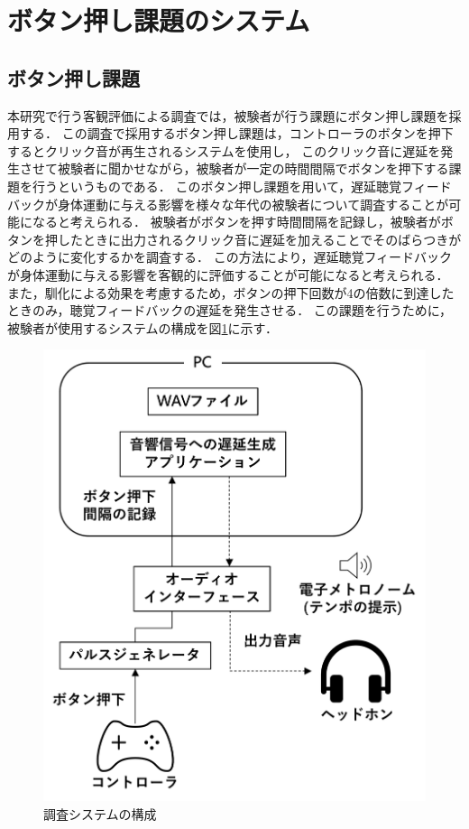 \section{ボタン押し課題のシステム}
\subsection{ボタン押し課題}
本研究で行う客観評価による調査では，被験者が行う課題にボタン押し課題を採用する．
この調査で採用するボタン押し課題は，コントローラのボタンを押下するとクリック音が再生されるシステムを使用し，
このクリック音に遅延を発生させて被験者に聞かせながら，被験者が一定の時間間隔でボタンを押下する課題を行うというものである．
このボタン押し課題を用いて，遅延聴覚フィードバックが身体運動に与える影響を様々な年代の被験者について調査することが可能になると考えられる．
被験者がボタンを押す時間間隔を記録し，被験者がボタンを押したときに出力されるクリック音に遅延を加えることでそのばらつきがどのように変化するかを調査する．
この方法により，遅延聴覚フィードバックが身体運動に与える影響を客観的に評価することが可能になると考えられる．
また，馴化による効果を考慮するため，ボタンの押下回数が4の倍数に到達したときのみ，聴覚フィードバックの遅延を発生させる．
この課題を行うために，被験者が使用するシステムの構成を図\ref{fig:button-click-system}に示す．
\begin{figure}[tb]
  \centering
  \includegraphics[scale=0.15]{figures/system_button_click.pdf}
  \caption{調査システムの構成}
  \label{fig:button-click-system}
\end{figure}
